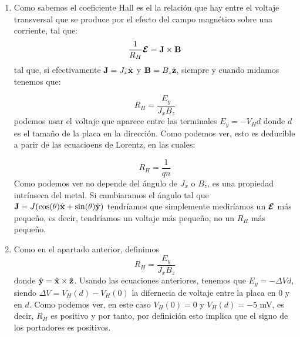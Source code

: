 \begin{enumerate}[label=\alph*)]
    \item Como sabemos el coeficiente Hall es el la relación que hay entre el voltaje transversal que se produce por el efecto del campo magnético sobre una corriente, tal que:
    \[
        \frac{1}{R_H}\boldsymbol{\mathcal{E}}  = \mathbf{J} \times \mathbf{B}
    \]
    tal que, si efectivamente $\mathbf{J} = J_x \hat{\mathbf{x}} $ y $\mathbf{B} = B_z \hat{\mathbf{z}}$, siempre y cuando midamos  tenemos que:

    \[
    R_H = \frac{E_y}{J_x B_z}
    \]
   podemos usar el voltaje que aparece entre las terminales $E_y = - V_H d$ donde $d$ es el tamaño de la placa en la dirección. Como podemos ver, esto es deducible a parir de las ecuacioens de Lorentz, en las cuales:
   
   \[
   R_H = \frac{1}{qn} 
   \]
   Como podemos ver no depende del ángulo de $J_x$ o $B_z$, es una propiedad intrínseca del metal. Si cambiaramos el ángulo tal que $\mathbf{J} = J (\cos (\theta) \hat{\mathbf{x}} + \sin (\theta) \hat{\mathbf{y}})$  tendríamos que simplemente mediríamos un $\boldsymbol{\mathcal{E}}$ más pequeño, es decir, tendríamos un voltaje más pequeño, no un $R_H$ más pequeño. 


   \item Como en el apartado anterior, definimos 
   \[
   R_H = \frac{E_y}{J_x B_z}
   \]
   donde $\hat{\mathbf{y}} = \hat{\mathbf{x}} \times \hat{\mathbf{z}}$. Usando las ecuaciones anteriores, tenemos que $E_y = - \Delta V d$, siendo $\Delta V = V_H(d)-V_H(0)$ la difernecia de voltaje entre la placa en $0$ y en $d$. Como podemos ver, en este caso $V_H(0)=0$ y $V_H(d)=-5$ mV, es decir, $R_H$ es positivo y por tanto, por definición esto implica que el signo de los portadores es positivos. 


\end{enumerate}
    